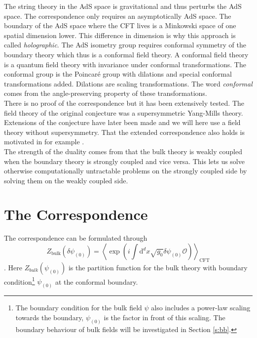 \documentclass[12pt]{report}
\renewcommand{\d}{\ensuremath{\mathrm{d}}}
\renewcommand{\i}{\ensuremath{i}}
\begin{document}
The string theory in the AdS space is gravitational and thus perturbs the AdS space. The correspondence only requires an asymptotically AdS space. The boundary of the AdS space where the CFT lives is a Minkowski space of one spatial dimension lower. This difference in dimension is why this approach is called \emph{holographic}. The AdS isometry group requires conformal symmetry of the boundary theory which thus is a conformal field theory.
A conformal field theory is a quantum field theory with invariance under conformal transformations. The conformal group is the Poincar\'{e} group with dilations and special conformal transformations added. Dilations are scaling transformations. The word \emph{conformal} comes from the angle-preserving property of these transformations.\\

There is no proof of the correspondence but it has been extensively tested. The field theory of the original conjecture \cite{Maldacena:1997re} was a supersymmetric Yang-Mills theory. Extensions of the conjecture have later been made and we will here use a field theory without supersymmetry. That the extended correspondence also holds is motivated in for example \cite{McGreevy:2009xe}.\\

The strength of the duality comes from that the bulk theory is weakly coupled when the boundary theory is strongly coupled and vice versa. This lets us solve otherwise computationally untractable problems on the strongly coupled side by solving them on the weakly coupled side.\\


\section{The Correspondence\label{correspondence}}
The correspondence can be formulated through
\begin{equation}
 Z_{\mathrm{bulk}}(\delta\psi_{(0)})=\left\langle\exp(\i\int\d^dx\sqrt{g_0}\delta\psi_{(0)}\mathcal{O})\right\rangle_{\mathrm{CFT}}\label{fulCorr}
\end{equation}
 \cite{hartnoll8}. Here $Z_{bulk}(\psi_{(0)})$ is the partition function for the bulk theory with boundary condition\footnote{The boundary condition for the bulk field $\psi$ also includes a power-law scaling towards the boundary, $\psi_{(0)}$ is the factor in front of this scaling. The boundary behaviour of bulk fields will be investigated in Section \ref{s:bb}.} $\psi_{(0)}$ at the conformal boundary.\\
\end{document}
